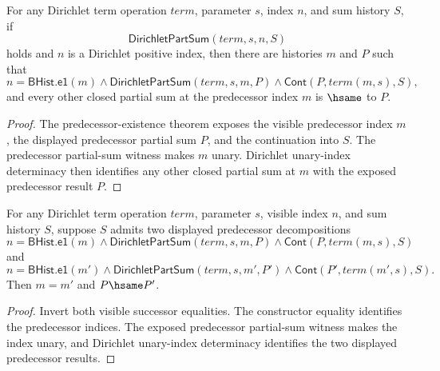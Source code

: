 \begin{theorem}
\label{thm:lfunction-positive-index-previous-unique}
For any Dirichlet term operation $term$, parameter $s$, index $n$, and sum
history $S$, if
$$
\mathsf{DirichletPartSum}(term,s,n,S)
$$
holds and $n$ is a Dirichlet positive index, then there are histories $m$ and
$P$ such that
$$
n=\mathsf{BHist.e1}(m)\land
\mathsf{DirichletPartSum}(term,s,m,P)\land
\mathsf{Cont}(P,term(m,s),S),
$$
and every other closed partial sum at the predecessor index $m$ is
$\hsame$ to $P$.
\end{theorem}
\begin{proof}
The predecessor-existence theorem exposes the visible predecessor index $m$,
the displayed predecessor partial sum $P$, and the continuation into $S$.
The predecessor partial-sum witness makes $m$ unary. Dirichlet unary-index
determinacy then identifies any other closed partial sum at $m$ with the
exposed predecessor result $P$.
\end{proof}

\begin{theorem}
\label{thm:lfunction-dirichlet-partsum-visible-previous-decomposition-deterministic}
For any Dirichlet term operation $term$, parameter $s$, visible index $n$,
and sum history $S$, suppose $S$ admits two displayed predecessor
decompositions
$$
n=\mathsf{BHist.e1}(m)\land
\mathsf{DirichletPartSum}(term,s,m,P)\land
\mathsf{Cont}(P,term(m,s),S)
$$
and
$$
n=\mathsf{BHist.e1}(m')\land
\mathsf{DirichletPartSum}(term,s,m',P')\land
\mathsf{Cont}(P',term(m',s),S).
$$
Then $m=m'$ and $P\hsame P'$.
\end{theorem}
\begin{proof}
Invert both visible successor equalities. The constructor equality identifies
the predecessor indices. The exposed predecessor partial-sum witness makes the
index unary, and Dirichlet unary-index determinacy identifies the two displayed
predecessor results.
\end{proof}

